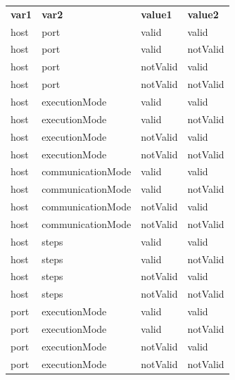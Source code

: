 \begin{table}[H]
    \small
    \begin{tabular}{llll}
        \textbf{var1}          & \textbf{var2}     & \textbf{value1} & \textbf{value2} \\
        host          & port              & valid           & valid           \\
        host          & port              & valid           & notValid        \\
        host          & port              & notValid        & valid           \\
        host          & port              & notValid        & notValid        \\
        host          & executionMode     & valid           & valid           \\
        host          & executionMode     & valid           & notValid        \\
        host          & executionMode     & notValid        & valid           \\
        host          & executionMode     & notValid        & notValid        \\
        host          & communicationMode & valid           & valid           \\
        host          & communicationMode & valid           & notValid        \\
        host          & communicationMode & notValid        & valid           \\
        host          & communicationMode & notValid        & notValid        \\
        host          & steps             & valid           & valid           \\
        host          & steps             & valid           & notValid        \\
        host          & steps             & notValid        & valid           \\
        host          & steps             & notValid        & notValid        \\
        port          & executionMode     & valid           & valid           \\
        port          & executionMode     & valid           & notValid        \\
        port          & executionMode     & notValid        & valid           \\
        port          & executionMode     & notValid        & notValid        \\

\end{tabular}
\end{table}
